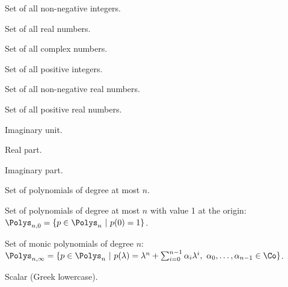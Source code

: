 
\begin{description}[style=multiline,leftmargin=3.2cm,font=\normalfont,noitemsep]
  \item[$\N$]
    Set of all non-negative integers.
  \item[$\R$]
    Set of all real numbers.
  \item[$\Co$]
    Set of all complex numbers.
  \item[$\N_+$]
    Set of all positive integers.
  \item[$\R_{\geq}$]
    Set of all non-negative real numbers.
  \item[$\R_+$]
    Set of all positive real numbers.
  \item[$\iu$]
    Imaginary unit.
  \item[$\Real$]
    Real part.
  \item[$\Imag$]
    Imaginary  part.
  \item[$\Polys_n$]
    Set of polynomials of degree at most $n$.
  \item[$\Polys_{n,0}$]
    Set of polynomials of degree at most $n$ with value 1 at the origin:\\
      $\Polys_{n,0}=\{p \in\Polys_n~|~p(0)=1\}$.
  \item[$\Polys_{n,\infty}$]
    Set of monic polynomials of degree $n$:\\
      $\Polys_{n,\infty}=\{p\in\Polys_n~|~p(\lambda) =\lambda^n+\sum_{i=0}^{n-1}\alpha_i\lambda^i,~\alpha_0,\ldots,\alpha_{n-1}\in\Co\}$.
  \item[$\alpha$]
    Scalar (Greek lowercase).
\end{description}



